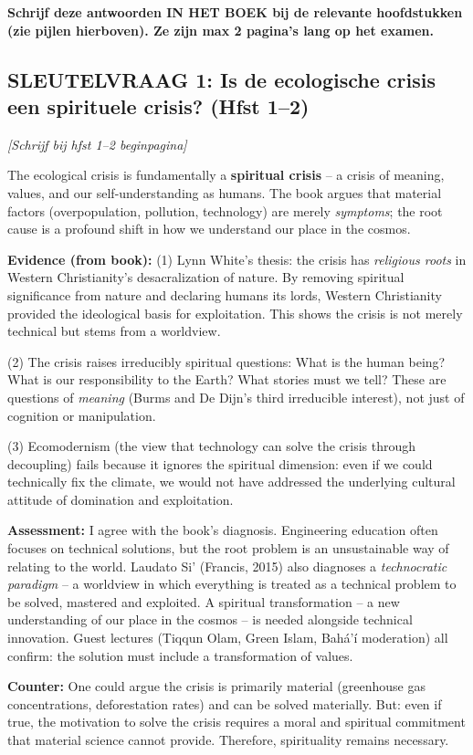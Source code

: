 \documentclass[a4paper,10pt]{article}
\begin{document}
\textbf{Schrijf deze antwoorden IN HET BOEK bij de relevante hoofdstukken (zie pijlen hierboven). Ze zijn max 2 pagina's lang op het examen.}

\vspace{3pt}

\begin{answerbox}
\subsection{SLEUTELVRAAG 1: Is de ecologische crisis een spirituele crisis? (Hfst 1--2)}

\textit{[Schrijf bij hfst 1--2 beginpagina]}

The ecological crisis is fundamentally a \textbf{spiritual crisis} -- a crisis of meaning, values, and our self-understanding as humans. The book argues that material factors (overpopulation, pollution, technology) are merely \textit{symptoms}; the root cause is a profound shift in how we understand our place in the cosmos.

\textbf{Evidence (from book):}
(1) Lynn White's thesis: the crisis has \textit{religious roots} in Western Christianity's desacralization of nature. By removing spiritual significance from nature and declaring humans its lords, Western Christianity provided the ideological basis for exploitation. This shows the crisis is not merely technical but stems from a worldview.

(2) The crisis raises irreducibly spiritual questions: What is the human being? What is our responsibility to the Earth? What stories must we tell? These are questions of \textit{meaning} (Burms and De Dijn's third irreducible interest), not just of cognition or manipulation.

(3) Ecomodernism (the view that technology can solve the crisis through decoupling) fails because it ignores the spiritual dimension: even if we could technically fix the climate, we would not have addressed the underlying cultural attitude of domination and exploitation.

\textbf{Assessment:} I agree with the book's diagnosis. Engineering education often focuses on technical solutions, but the root problem is an unsustainable way of relating to the world. Laudato Si' (Francis, 2015) also diagnoses a \textit{technocratic paradigm} -- a worldview in which everything is treated as a technical problem to be solved, mastered and exploited. A spiritual transformation -- a new understanding of our place in the cosmos -- is needed alongside technical innovation. Guest lectures (Tiqqun Olam, Green Islam, Bah\'a'\'i\xspace moderation) all confirm: the solution must include a transformation of values.

\textbf{Counter:} One could argue the crisis is primarily material (greenhouse gas concentrations, deforestation rates) and can be solved materially. But: even if true, the motivation to solve the crisis requires a moral and spiritual commitment that material science cannot provide. Therefore, spirituality remains necessary.
\end{answerbox}
\end{document}
